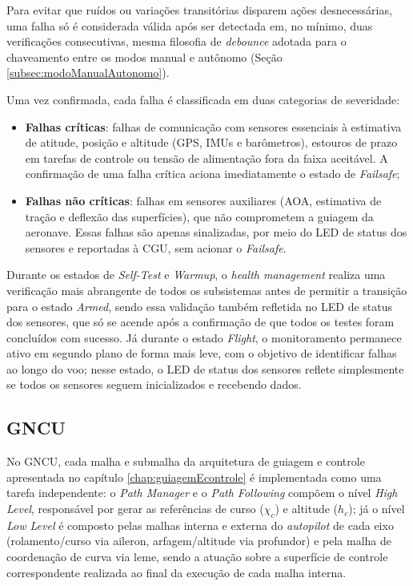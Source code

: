 Para evitar que ruídos ou variações transitórias disparem ações desnecessárias, uma falha só é considerada válida após ser detectada em, no mínimo, duas verificações consecutivas, mesma filosofia de \textit{debounce} adotada para o chaveamento entre os modos manual e autônomo (Seção \ref{subsec:modoManualAutonomo}).

Uma vez confirmada, cada falha é classificada em duas categorias de severidade:

\begin{itemize}
    \item \textbf{Falhas críticas}: falhas de comunicação com sensores essenciais à estimativa de atitude, posição e altitude (GPS, IMUs e barômetros), estouros de prazo em tarefas de controle ou tensão de alimentação fora da faixa aceitável. A confirmação de uma falha crítica aciona imediatamente o estado de \textit{Failsafe};
    \item \textbf{Falhas não críticas}: falhas em sensores auxiliares (AOA, estimativa de tração e deflexão das superfícies), que não comprometem a guiagem da aeronave. Essas falhas são apenas sinalizadas, por meio do LED de status dos sensores e reportadas à CGU, sem acionar o \textit{Failsafe}.
\end{itemize}

Durante os estados de \textit{Self-Test} e \textit{Warmup}, o \textit{health management} realiza uma verificação mais abrangente de todos os subsistemas antes de permitir a transição para o estado \textit{Armed}, sendo essa validação também refletida no LED de status dos sensores, que só se acende após a confirmação de que todos os testes foram concluídos com sucesso. Já durante o estado \textit{Flight}, o monitoramento permanece ativo em segundo plano de forma mais leve, com o objetivo de identificar falhas ao longo do voo; nesse estado, o LED de status dos sensores reflete simplesmente se todos os sensores seguem inicializados e recebendo dados.

\subsection{GNCU}
\label{subsec:gncuTarefas}

No GNCU, cada malha e submalha da arquitetura de guiagem e controle apresentada no capítulo \ref{chap:guiagemEcontrole} é implementada como uma tarefa independente: o \textit{Path Manager} e o \textit{Path Following} compõem o nível \textit{High Level}, responsável por gerar as referências de curso ($\chi_c$) e altitude ($h_c$); já o nível \textit{Low Level} é composto pelas malhas interna e externa do \textit{autopilot} de cada eixo (rolamento/curso via aileron, arfagem/altitude via profundor) e pela malha de coordenação de curva via leme, sendo a atuação sobre a superfície de controle correspondente realizada ao final da execução de cada malha interna.

